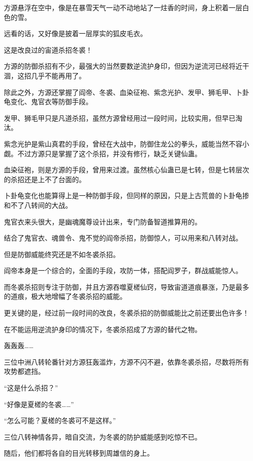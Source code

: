 
\begin{this_body}

方源悬浮在空中，像是在暴雪天气一动不动地站了一炷香的时间，身上积着一层白色的雪。

远看的话，又好像是披着一层厚实的狐皮毛衣。

这是改良过的宙道杀招冬裘！

方源的防御杀招有不少，最强大的当然要数逆流护身印，但因为逆流河已经将近干涸，这招几乎不能再用了。

除此之外，方源还掌握了阎帝、冬裘、血染征袍、紫念光护、发甲、狮毛甲、卜卦龟变化、鬼官衣等防御手段。

发甲、狮毛甲只是凡道杀招，虽然方源曾经用过一段时间，比较实用，但早已淘汰。

紫念光护是紫山真君的手段，曾经在大战中，防御住龙公的拳头，威能当然不容小觑。不过方源只是掌握了这个杀招，并没有修行，缺乏关键仙蛊。

血染征袍，则是方源的手段，曾用来过渡。虽然核心仙蛊已是七转，但是七转层次的杀招还是上不了台面的。

卜卦龟变化也能算得上是一种防御手段，但同样的原因，只是上古荒兽的卜卦龟掺和不了八转间的大战。

鬼官衣来头很大，是幽魂魔尊设计出来，专门防备智道推算用的。

结合了鬼官衣、魂兽令、鬼不觉的阎帝杀招，防御惊人，可以用来和八转对战。

但是防御威能终究还是不如冬裘杀招。

阎帝本身是一个综合的，全面的手段，攻防一体，搭配阎罗子，群战威能惊人。

而冬裘杀招则专注于防御，并且方源吞噬夏槎仙窍，导致宙道道痕暴涨，乃是最多的道痕，极大地增幅了冬裘杀招的威能。

更关键的是，经过前一段时间的改良，冬裘杀招的防御威能比之前还要出色许多！

在不能运用逆流护身印的情况下，冬裘杀招成了方源的替代之物。

轰轰轰……

三位中洲八转轮番针对方源狂轰滥炸，方源不闪不避，依靠冬裘杀招，尽数将所有攻势都遮挡。

“这是什么杀招？”

“好像是夏槎的冬裘……”

“怎么可能？夏槎的冬裘可不是这样。”

三位八转神情各异，暗自交流，为冬裘的防护威能感到吃惊不已。

随后，他们都将各自的目光转移到周雄信的身上。


\end{this_body}
